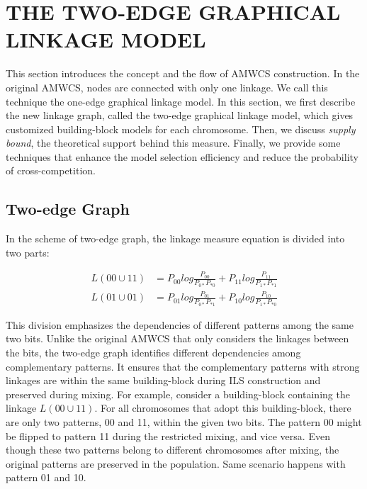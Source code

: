 \documentclass{sig-alternate-05-2015}
\begin{document}
\section{THE TWO-EDGE GRAPHICAL LINKAGE MODEL}
This section introduces the concept and the flow of AMWCS construction. In the original AMWCS, nodes are connected with only one linkage. We call this technique the one-edge graphical linkage model. In this section, we first describe the new linkage graph, called the two-edge graphical linkage model, which gives customized building-block models for each chromosome. Then, we discuss \textit{supply bound}, the theoretical support behind this measure. Finally, we provide some techniques that enhance the model selection efficiency and reduce the probability of cross-competition. 

\subsection{Two-edge Graph}
In the scheme of two-edge graph, the linkage measure equation is divided into two parts:

\begin{equation} 
\begin{split}
L( 00 \cup 11 ) &= P_{00 }log\frac{P_{00}}{P_{0*} P_{*0}} + P_{11 }log\frac{P_{11}}{P_{1*} P_{*1}}  \\
L( 01 \cup 01 ) &= P_{01 }log\frac{P_{01}}{P_{0*} P_{*1}} + P_{10 }log\frac{P_{10}}{P_{1*} P_{*0}}  
\end{split}
\end{equation}

This division emphasizes the dependencies of different patterns among the same two bits. Unlike the original AMWCS that only considers the linkages between the bits, the two-edge graph identifies different dependencies among complementary patterns. It ensures that the complementary patterns with strong linkages are within the same building-block during ILS construction and preserved during mixing. For example, consider a building-block containing the linkage $L(00\cup11)$. For all chromosomes that adopt this building-block, there are only two patterns, 00 and 11, within the given two bits. The pattern 00 might be flipped to pattern 11 during the restricted mixing, and vice versa. Even though these two patterns belong to different chromosomes after mixing, the original patterns are preserved in the population. Same scenario happens with pattern 01 and 10.
\end{document}
